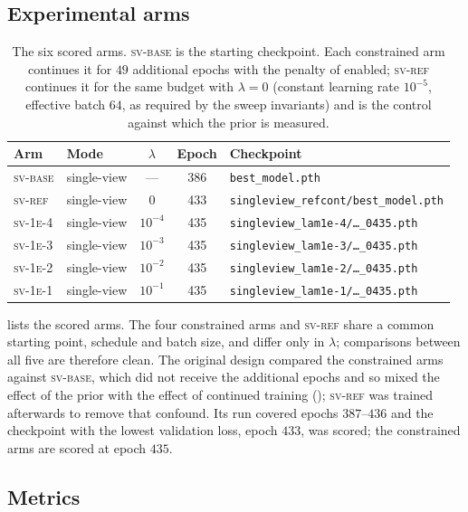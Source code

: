 \documentclass[11pt,a4paper]{article}
\newcommand{\lam}{\lambda}
\newcommand{\armref}{\textsc{sv-ref}}
\newcommand{\armbase}{\textsc{sv-base}}
\begin{document}
\subsection{Experimental arms}

\begin{table}[t]
\centering
\small
\caption{The six scored arms. \armbase{} is the starting checkpoint. Each
constrained arm continues it for $49$ additional epochs with the penalty of
 enabled; \armref{} continues it for the same budget with
$\lam = 0$ (constant learning rate $10^{-5}$, effective batch $64$, as required
by the sweep invariants) and is the control against which the prior is
measured.}
\label{tab:arms}
\begin{tabular}{llccl}
\toprule
Arm & Mode & $\lam$ & Epoch & Checkpoint \\
\midrule
\armbase{}           & single-view & ---       & 386 & \texttt{best\_model.pth} \\
\midrule
\armref{}            & single-view & $0$       & 433 & \texttt{singleview\_refcont/best\_model.pth} \\
\textsc{sv-1e-4}     & single-view & $10^{-4}$ & 435 & \texttt{singleview\_lam1e-4/\dots\_0435.pth} \\
\textsc{sv-1e-3}     & single-view & $10^{-3}$ & 435 & \texttt{singleview\_lam1e-3/\dots\_0435.pth} \\
\textsc{sv-1e-2}     & single-view & $10^{-2}$ & 435 & \texttt{singleview\_lam1e-2/\dots\_0435.pth} \\
\textsc{sv-1e-1}     & single-view & $10^{-1}$ & 435 & \texttt{singleview\_lam1e-1/\dots\_0435.pth} \\
\bottomrule
\end{tabular}
\end{table}

 lists the scored arms. The four constrained arms and \armref{}
share a common starting point, schedule and batch size, and differ only in
$\lam$; comparisons between all five are therefore clean. The original design
compared the constrained arms against \armbase{}, which did not receive the
additional epochs and so mixed the effect of the prior with the effect of
continued training (); \armref{} was trained
afterwards to remove that confound. Its run covered epochs $387$--$436$ and
the checkpoint with the lowest validation loss, epoch $433$, was scored;
the constrained arms are scored at epoch $435$.

\subsection{Metrics}
\label{sec:metrics}
\end{document}
